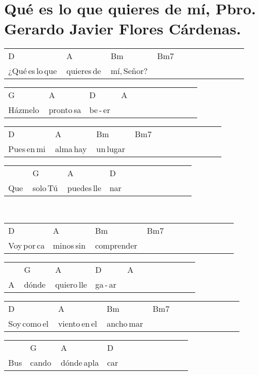 \section*{Qué es lo que quieres de mí, Pbro. Gerardo Javier Flores Cárdenas.\hfill}
\begin{multicols}{2}
\noindent
\begin{minipage}{\columnwidth}
\noindent
\noindent
\begin{tabular}{llllllllllll}
D&A&Bm&Bm7\\
¿Qué\,es\,lo\,que\,&quieres\,de\,&mí,\,Señor?\,&
\end{tabular}

\noindent
\begin{tabular}{llllllllllll}
G&A&D&A\\
Házmelo\,&pronto\,sa&be\,-\,er\,\,&
\end{tabular}

\noindent
\begin{tabular}{llllllllllll}
D&A&Bm&Bm7\\
Pues\,en\,mi\,&alma\,hay\,&un\,lugar\,&
\end{tabular}

\noindent
\begin{tabular}{llllllllllll}
&G&A&D\\
Que\,&solo\,Tú\,&puedes\,lle&nar
\end{tabular}
\end{minipage}\\

\noindent
\begin{minipage}{\columnwidth}
\noindent
\noindent
\begin{tabular}{llllllllllll}
D&A&Bm&Bm7\\
Voy\,por\,ca&minos\,sin\,&comprender\,&
\end{tabular}

\noindent
\begin{tabular}{llllllllllll}
&G&A&D&A\\
A\,&dónde\,&quiero\,lle&ga\,-\,ar\,\,&
\end{tabular}

\noindent
\begin{tabular}{llllllllllll}
D&A&Bm&Bm7\\
Soy\,como\,el\,&viento\,en\,el\,&ancho\,mar\,&
\end{tabular}

\noindent
\begin{tabular}{llllllllllll}
&G&A&D\\
Bus&cando\,&dónde\,apla&car
\end{tabular}
\end{minipage}\\


\end{multicols}
